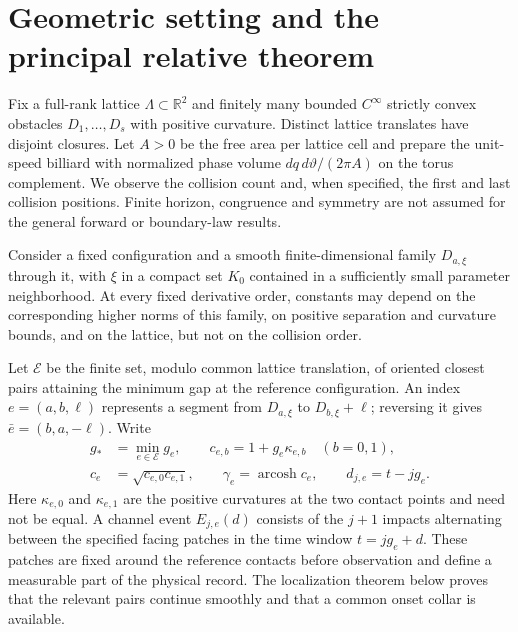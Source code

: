 \section{Geometric setting and the principal relative theorem}
\label{sec:v18-formal-setup}
\label{sec:geometric-results}

Fix a full-rank lattice $\Lambda\subset\mathbb R^2$ and finitely many
bounded $C^\infty$ strictly convex obstacles $D_1,\ldots,D_s$ with
positive curvature. Distinct lattice translates have disjoint closures.
Let $A>0$ be the free area per lattice cell and prepare the unit-speed
billiard with normalized phase volume $dq\,d\vartheta/(2\pi A)$ on the
torus complement. We observe the collision count and, when specified, the
first and last collision positions. Finite horizon, congruence and symmetry
are not assumed for the general forward or boundary-law results.

Consider a fixed configuration and a smooth finite-dimensional family
$D_{a,\xi}$ through it, with $\xi$ in a compact set $K_0$ contained in a
sufficiently small parameter neighborhood. At every fixed derivative order,
constants may depend on the corresponding higher norms of this family, on
positive separation and curvature bounds, and on the lattice, but not on
the collision order.

Let $\mathcal E$ be the finite set, modulo common lattice translation, of
oriented closest pairs attaining the minimum gap at the reference
configuration. An index $e=(a,b,\ell)$ represents a segment from
$D_{a,\xi}$ to $D_{b,\xi}+\ell$; reversing it gives
$\bar e=(b,a,-\ell)$. Write
\begin{equation}\label{eq:g-general-data}
 \begin{split}
 g_*&=\min_{e\in\mathcal E}g_e,\qquad
 c_{e,b}=1+g_e\kappa_{e,b}\quad(b=0,1),\\
 c_e&=\sqrt{c_{e,0}c_{e,1}},\qquad
 \gamma_e=\operatorname{arcosh}c_e,
 \qquad d_{j,e}=t-jg_e.
 \end{split}
\end{equation}
Here $\kappa_{e,0}$ and $\kappa_{e,1}$ are the positive curvatures at the
two contact points and need not be equal. A channel event $E_{j,e}(d)$
consists of the $j+1$ impacts alternating between the specified facing
patches in the time window $t=jg_e+d$. These patches are fixed around the
reference contacts before observation and define a measurable part of the
physical record. The localization theorem below proves that the relevant
pairs continue smoothly and that a common onset collar is available.

